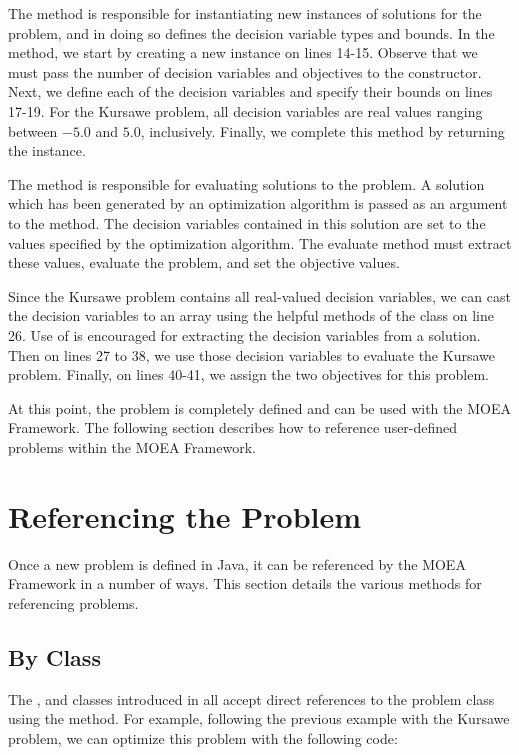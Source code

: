 The  method is responsible for instantiating new instances of solutions for the problem, and in doing so defines the decision variable types and bounds.  In the  method, we start by creating a new  instance on lines 14-15.  Observe that we must pass the number of decision variables and objectives to the  constructor.  Next, we define each of the decision variables and specify their bounds on lines 17-19.  For the Kursawe problem, all decision variables are real values ranging between $-5.0$ and $5.0$, inclusively.  Finally, we complete this method by returning the  instance.

The  method is responsible for evaluating solutions to the problem.  A solution which has been generated by an optimization algorithm is passed as an argument to the  method.  The decision variables contained in this solution are set to the values specified by the optimization algorithm.  The evaluate method must extract these values, evaluate the problem, and set the objective values.

Since the Kursawe problem contains all real-valued decision variables, we can cast the decision variables to an array using the helpful methods of the  class on line 26.  Use of  is encouraged for extracting the decision variables from a solution.  Then on lines 27 to 38, we use those decision variables to evaluate the Kursawe problem.  Finally, on lines 40-41, we assign the two objectives for this problem.

At this point, the problem is completely defined and can be used with the MOEA Framework.  The following section describes how to reference user-defined problems within the MOEA Framework.

\section{Referencing the Problem}
Once a new problem is defined in Java, it can be referenced by the MOEA Framework in a number of ways.  This section details the various methods for referencing problems.

\subsection{By Class}
The ,  and  classes introduced in  all accept direct references to the problem class using the  method.  For example, following the previous example with the Kursawe problem, we can optimize this problem with the following code:

